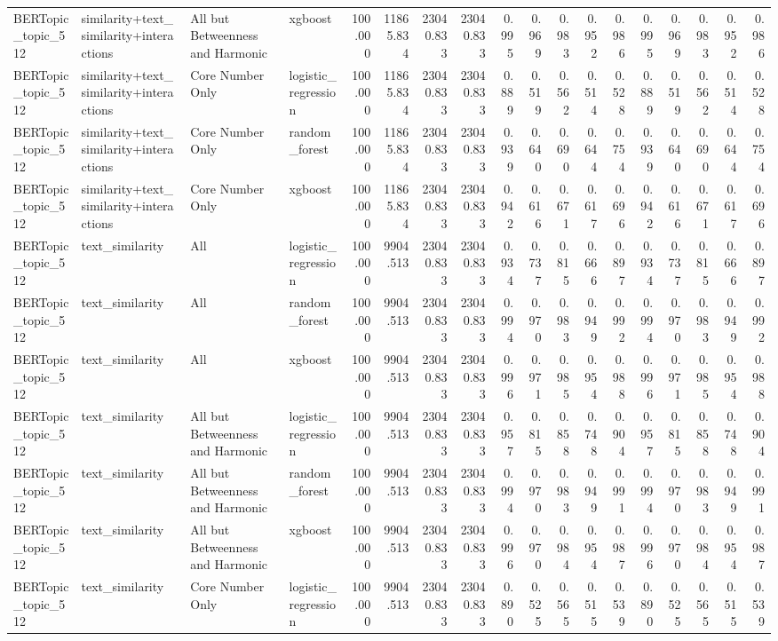 \begin{tabular}{llllrrrrrrrrrrrrrr}
BERTopic_topic_512 & similarity+text_similarity+interactions & All but Betweenness and Harmonic & xgboost & 100.000 & 11865.834 & 23040.833 & 23040.833 & 0.995 & 0.969 & 0.983 & 0.952 & 0.986 & 0.995 & 0.969 & 0.983 & 0.952 & 0.986 \\
BERTopic_topic_512 & similarity+text_similarity+interactions & Core Number Only & logistic_regression & 100.000 & 11865.834 & 23040.833 & 23040.833 & 0.889 & 0.519 & 0.562 & 0.514 & 0.528 & 0.889 & 0.519 & 0.562 & 0.514 & 0.528 \\
BERTopic_topic_512 & similarity+text_similarity+interactions & Core Number Only & random_forest & 100.000 & 11865.834 & 23040.833 & 23040.833 & 0.939 & 0.640 & 0.690 & 0.644 & 0.754 & 0.939 & 0.640 & 0.690 & 0.644 & 0.754 \\
BERTopic_topic_512 & similarity+text_similarity+interactions & Core Number Only & xgboost & 100.000 & 11865.834 & 23040.833 & 23040.833 & 0.942 & 0.616 & 0.671 & 0.617 & 0.696 & 0.942 & 0.616 & 0.671 & 0.617 & 0.696 \\
BERTopic_topic_512 & text_similarity & All & logistic_regression & 100.000 & 9904.513 & 23040.833 & 23040.833 & 0.934 & 0.737 & 0.815 & 0.666 & 0.897 & 0.934 & 0.737 & 0.815 & 0.666 & 0.897 \\
BERTopic_topic_512 & text_similarity & All & random_forest & 100.000 & 9904.513 & 23040.833 & 23040.833 & 0.994 & 0.970 & 0.983 & 0.949 & 0.992 & 0.994 & 0.970 & 0.983 & 0.949 & 0.992 \\
BERTopic_topic_512 & text_similarity & All & xgboost & 100.000 & 9904.513 & 23040.833 & 23040.833 & 0.996 & 0.971 & 0.985 & 0.954 & 0.988 & 0.996 & 0.971 & 0.985 & 0.954 & 0.988 \\
BERTopic_topic_512 & text_similarity & All but Betweenness and Harmonic & logistic_regression & 100.000 & 9904.513 & 23040.833 & 23040.833 & 0.957 & 0.815 & 0.858 & 0.748 & 0.904 & 0.957 & 0.815 & 0.858 & 0.748 & 0.904 \\
BERTopic_topic_512 & text_similarity & All but Betweenness and Harmonic & random_forest & 100.000 & 9904.513 & 23040.833 & 23040.833 & 0.994 & 0.970 & 0.983 & 0.949 & 0.991 & 0.994 & 0.970 & 0.983 & 0.949 & 0.991 \\
BERTopic_topic_512 & text_similarity & All but Betweenness and Harmonic & xgboost & 100.000 & 9904.513 & 23040.833 & 23040.833 & 0.996 & 0.970 & 0.984 & 0.954 & 0.987 & 0.996 & 0.970 & 0.984 & 0.954 & 0.987 \\
BERTopic_topic_512 & text_similarity & Core Number Only & logistic_regression & 100.000 & 9904.513 & 23040.833 & 23040.833 & 0.890 & 0.525 & 0.565 & 0.515 & 0.539 & 0.890 & 0.525 & 0.565 & 0.515 & 0.539 \\

\end{tabular}
